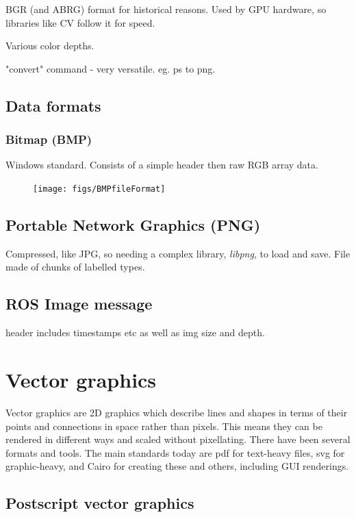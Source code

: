 \documentclass[oneside,english]{scrbook}
\begin{document}
BGR (and ABRG) format for historical reasons. Used by GPU hardware, so libraries like CV follow it for speed.

Various color depths.

"convert" command - very versatile. eg. ps to png.


\section{Data formats}


\subsection{Bitmap (BMP)}

Windows standard. Consists of a simple header then raw RGB array data.

\begin{figure}
	\caption{}
	\texttt{[image: figs/BMPfileFormat]}
\end{figure}



\section{Portable Network Graphics (PNG)}

Compressed, like JPG, so needing a complex library, {\em libpng}, to load and save.  File made of chunks of labelled types.


\section{ROS Image message}

header includes timestamps etc as well as img size and depth.



\chapter{Vector graphics}

Vector graphics are 2D graphics which describe lines and shapes in terms of their points and connections in space rather than pixels. This means they can be rendered in different ways and scaled without pixellating.  There have been several formats and tools. The main standards today are pdf for text-heavy files, svg for graphic-heavy, and Cairo for creating these and others, including GUI renderings.

\section{Postscript vector graphics}
\end{document}

